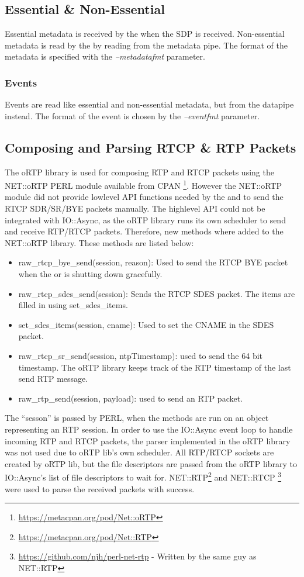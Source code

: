 \subsection{Essential \& Non-Essential} \label{sec:implementation:esssub}
Essential metadata is received by the \sub{} when the SDP is received. Non-essential metadata is read by the  \con{} by reading from the metadata pipe. The format of the metadata is specified with the \textit{--metadatafmt} parameter.

\subsubsection{Events} \label{sec:implementation:eventssub}
Events are read like essential and non-essential metadata, but from the datapipe instead. The format of the event is chosen by the \textit{--eventfmt} parameter.


\subsection{Composing and Parsing RTCP \& RTP Packets}
The oRTP library is used for composing RTP and RTCP packets using the NET::oRTP PERL module available from CPAN \footnote{\url{https://metacpan.org/pod/Net::oRTP}}. However the NET::oRTP module did not provide lowlevel API functions needed by the \pub{} and \sub{} to send the RTCP SDR/SR/BYE packets manually. The highlevel API could not be integrated with IO::Async, as the oRTP library runs its own scheduler to send and receive RTP/RTCP packets. Therefore, new methods where added to the NET::oRTP library. These methods are listed below:

\begin{itemize}
	\item raw\_rtcp\_bye\_send(session, reason): Used to send the RTCP BYE packet when the \pub{} or \sub{} is shutting down gracefully.
	\item raw\_rtcp\_sdes\_send(session): Sends the RTCP SDES packet. The items are filled in using set\_sdes\_items.
	\item set\_sdes\_items(session, cname): Used to set the \ac{CNAME} in the SDES packet.
	\item raw\_rtcp\_sr\_send(session, ntpTimestamp): used to send the 64 bit timestamp. The oRTP library keeps track of the RTP timestamp of the last send RTP message.
	\item raw\_rtp\_send(session, payload): used to send an RTP packet.
\end{itemize}
The ``sesson'' is passed by PERL, when the methods are run on an object representing an RTP session. In order to use the IO::Async event loop to handle incoming RTP and RTCP packets, the parser implemented in the oRTP library was not used due to oRTP lib's own scheduler. All RTP/RTCP sockets are created by oRTP lib, but the file descriptors are passed from the oRTP library to IO::Async's list of file descriptors to wait for.  NET::RTP\footnote{\url{https://metacpan.org/pod/Net::RTP}} and NET::RTCP \footnote{\url{https://github.com/njh/perl-net-rtp} - Written by the same guy as NET::RTP} were used to parse the received packets with success.\\

